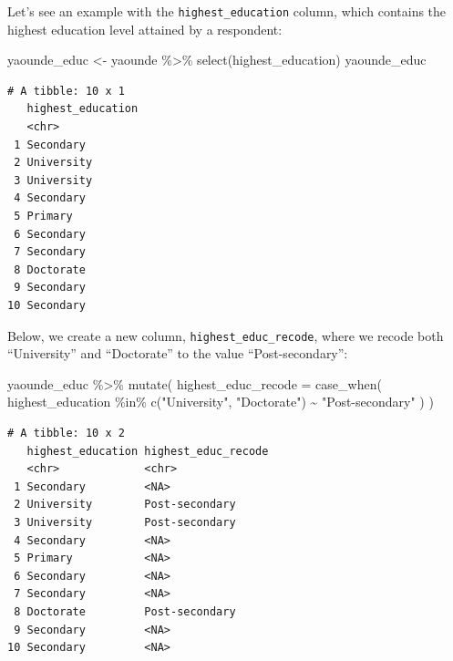 \documentclass[
  letterpaper,
  DIV=11,
  numbers=noendperiod]{scrreprt}
\newenvironment{Shaded}{\begin{snugshade}}{\end{snugshade}}
\newcommand{\AttributeTok}[1]{\textcolor[rgb]{0.40,0.45,0.13}{#1}}
\newcommand{\FunctionTok}[1]{\textcolor[rgb]{0.28,0.35,0.67}{#1}}
\newcommand{\NormalTok}[1]{\textcolor[rgb]{0.00,0.23,0.31}{#1}}
\newcommand{\OtherTok}[1]{\textcolor[rgb]{0.00,0.23,0.31}{#1}}
\newcommand{\SpecialCharTok}[1]{\textcolor[rgb]{0.37,0.37,0.37}{#1}}
\newcommand{\StringTok}[1]{\textcolor[rgb]{0.13,0.47,0.30}{#1}}
\begin{document}
Let's see an example with the \texttt{highest\_education} column, which
contains the highest education level attained by a respondent:

\begin{Shaded}
\begin{Highlighting}[]
\NormalTok{yaounde\_educ }\OtherTok{\textless{}{-}} 
\NormalTok{  yaounde }\SpecialCharTok{\%\textgreater{}\%} 
  \FunctionTok{select}\NormalTok{(highest\_education)}
\NormalTok{yaounde\_educ}
\end{Highlighting}
\end{Shaded}

\begin{verbatim}
# A tibble: 10 x 1
   highest_education
   <chr>            
 1 Secondary        
 2 University       
 3 University       
 4 Secondary        
 5 Primary          
 6 Secondary        
 7 Secondary        
 8 Doctorate        
 9 Secondary        
10 Secondary        
\end{verbatim}

Below, we create a new column, \texttt{highest\_educ\_recode}, where we
recode both ``University'' and ``Doctorate'' to the value
``Post-secondary'':

\begin{Shaded}
\begin{Highlighting}[]
\NormalTok{yaounde\_educ }\SpecialCharTok{\%\textgreater{}\%}
  \FunctionTok{mutate}\NormalTok{(}
    \AttributeTok{highest\_educ\_recode =}
      \FunctionTok{case\_when}\NormalTok{(}
\NormalTok{        highest\_education }\SpecialCharTok{\%in\%} \FunctionTok{c}\NormalTok{(}\StringTok{"University"}\NormalTok{, }\StringTok{"Doctorate"}\NormalTok{) }\SpecialCharTok{\textasciitilde{}} \StringTok{"Post{-}secondary"}
\NormalTok{      )}
\NormalTok{  )}
\end{Highlighting}
\end{Shaded}

\begin{verbatim}
# A tibble: 10 x 2
   highest_education highest_educ_recode
   <chr>             <chr>              
 1 Secondary         <NA>               
 2 University        Post-secondary     
 3 University        Post-secondary     
 4 Secondary         <NA>               
 5 Primary           <NA>               
 6 Secondary         <NA>               
 7 Secondary         <NA>               
 8 Doctorate         Post-secondary     
 9 Secondary         <NA>               
10 Secondary         <NA>               
\end{verbatim}
\end{document}
